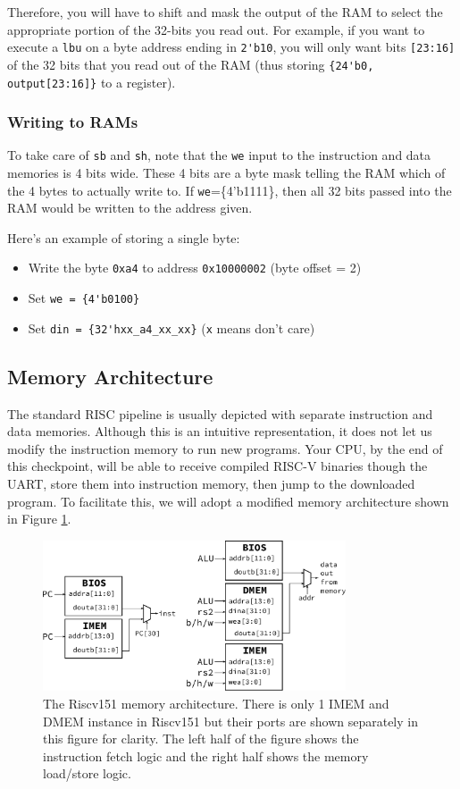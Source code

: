 \documentclass[11pt]{article}
\begin{document}
Therefore, you will have to shift and mask the output of the RAM to select the appropriate portion of the 32-bits you read out.
For example, if you want to execute a \verb|lbu| on a byte address ending in \verb|2'b10|, you will only want bits \verb|[23:16]| of the 32 bits that you read out of the RAM (thus storing \verb|{24'b0, output[23:16]}| to a register).

\subsubsection{Writing to RAMs}
To take care of \verb|sb| and \verb|sh|, note that the \verb|we| input to the instruction and data memories is 4 bits wide.
These 4 bits are a byte mask telling the RAM which of the 4 bytes to actually write to.
If \verb|we|=\{4'b1111\}, then all 32 bits passed into the RAM would be written to the address given.

Here's an example of storing a single byte:
\begin{itemize}
  \item Write the byte \verb|0xa4| to address \verb|0x10000002| (byte offset = 2)
  \item Set \verb|we = {4'b0100}|
  \item Set \verb|din = {32'hxx_a4_xx_xx}| (\verb|x| means don't care)
\end{itemize}

\subsection{Memory Architecture}
The standard RISC pipeline is usually depicted with separate instruction and data memories.
Although this is an intuitive representation, it does not let us modify the instruction memory to run new programs.
Your CPU, by the end of this checkpoint, will be able to receive compiled RISC-V binaries though the UART, store them into instruction memory, then jump to the downloaded program.
To facilitate this, we will adopt a modified memory architecture shown in Figure \ref{fig:mem_arch}.

\begin{figure}[hbt]
  \begin{center}
    \includegraphics[width=0.8\textwidth]{memory_arch.pdf}
    \caption{The Riscv151 memory architecture. There is only 1 IMEM and DMEM instance in Riscv151 but their ports are shown separately in this figure for clarity. The left half of the figure shows the instruction fetch logic and the right half shows the memory load/store logic.}
    \label{fig:mem_arch}
  \end{center}
\end{figure}
\end{document}
